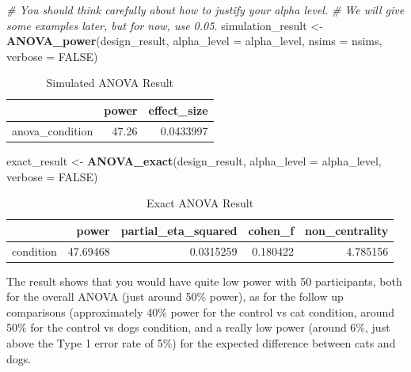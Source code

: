 \documentclass[
]{book}
\newenvironment{Shaded}{\begin{snugshade}}{\end{snugshade}}
\newcommand{\CommentTok}[1]{\textcolor[rgb]{0.56,0.35,0.01}{\textit{#1}}}
\newcommand{\DataTypeTok}[1]{\textcolor[rgb]{0.13,0.29,0.53}{#1}}
\newcommand{\KeywordTok}[1]{\textcolor[rgb]{0.13,0.29,0.53}{\textbf{#1}}}
\newcommand{\NormalTok}[1]{#1}
\newcommand{\OtherTok}[1]{\textcolor[rgb]{0.56,0.35,0.01}{#1}}
\newcommand{\StringTok}[1]{\textcolor[rgb]{0.31,0.60,0.02}{#1}}
\begin{document}
\begin{Shaded}
\begin{Highlighting}[]
\CommentTok{# You should think carefully about how to justify your alpha level.}
\CommentTok{# We will give some examples later, but for now, use 0.05.}
\NormalTok{simulation_result <-}\StringTok{ }\KeywordTok{ANOVA_power}\NormalTok{(design_result, }
                                 \DataTypeTok{alpha_level =}\NormalTok{ alpha_level, }
                                 \DataTypeTok{nsims =}\NormalTok{ nsims,}
                                 \DataTypeTok{verbose =} \OtherTok{FALSE}\NormalTok{)}
\end{Highlighting}
\end{Shaded}

\begin{table}[!h]

\caption{\label{tab:unnamed-chunk-34}Simulated ANOVA Result}
\centering
\begin{tabular}[t]{l|r|r}
\hline
  & power & effect\_size\\
\hline
anova\_condition & 47.26 & 0.0433997\\
\hline
\end{tabular}
\end{table}

\begin{Shaded}
\begin{Highlighting}[]
\NormalTok{exact_result <-}\StringTok{ }\KeywordTok{ANOVA_exact}\NormalTok{(design_result,}
                            \DataTypeTok{alpha_level =}\NormalTok{ alpha_level,}
                            \DataTypeTok{verbose =} \OtherTok{FALSE}\NormalTok{)}
\end{Highlighting}
\end{Shaded}

\begin{table}[!h]

\caption{\label{tab:unnamed-chunk-36}Exact ANOVA Result}
\centering
\begin{tabular}[t]{l|r|r|r|r}
\hline
  & power & partial\_eta\_squared & cohen\_f & non\_centrality\\
\hline
condition & 47.69468 & 0.0315259 & 0.180422 & 4.785156\\
\hline
\end{tabular}
\end{table}

The result shows that you would have quite low power with 50 participants, both for the overall ANOVA (just around 50\% power), as for the follow up comparisons (approximately 40\% power for the control vs cat condition, around 50\% for the control vs dogs condition, and a really low power (around 6\%, just above the Type 1 error rate of 5\%) for the expected difference between cats and dogs.
\end{document}
